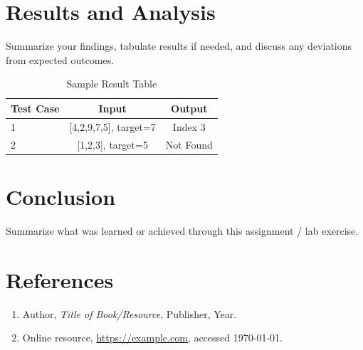 \documentclass[11pt,a4paper]{article}
\begin{document}
\section{Results and Analysis}
Summarize your findings, tabulate results if needed, and discuss any deviations
from expected outcomes.

\begin{table}[h]
\centering
\caption{Sample Result Table}
\begin{tabular}{@{}lcc@{}}
\toprule
\textbf{Test Case} & \textbf{Input} & \textbf{Output} \\
\midrule
1 & [4,2,9,7,5], target=7 & Index 3 \\
2 & [1,2,3], target=5     & Not Found \\
\bottomrule
\end{tabular}
\end{table}

\section{Conclusion}
Summarize what was learned or achieved through this assignment / lab exercise.

\section*{References}
\begin{enumerate}[leftmargin=1.4em]
  \item Author, \textit{Title of Book/Resource}, Publisher, Year.
  \item Online resource, \url{https://example.com}, accessed \today.
\end{enumerate}
\end{document}
